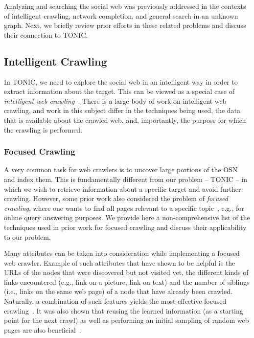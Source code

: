 \documentclass[journal]{IEEEtran}
\begin{document}


Analyzing and searching the social web was previously addressed in the contexts of intelligent crawling, network completion, and general search in an unknown graph. Next, we briefly review prior efforts in these related problems and discuss their connection to TONIC.


\subsection{Intelligent Crawling}
\label{sec:webCrawling}
In TONIC, we need to explore the social web in an intelligent way in order to extract information about the target. This can be viewed as a special case of {\em intelligent web crawling}~\cite{aggarwal2001intelligent,zareh2007fica,cai2008irobot}. %
There is a large body of work on intelligent web crawling, and work in this subject differ in the techniques being used, the data that is available about the crawled web, and, importantly, the purpose for which the crawling is performed. 


\subsubsection{Focused Crawling}
A very common task for web crawlers is to uncover large portions of the OSN and index them. This is fundamentally different from our problem -- TONIC -- in which we wish to retrieve information about a specific target and avoid further crawling. However, some prior work also considered the problem of {\em focused crawling}, where one wants to find  all pages relevant to a specific topic~\cite{diligenti2000focused,menczer2001evaluating}, e.g., for online query answering purposes. We provide here a non-comprehensive list of the techniques used in prior work for focused crawling and discuss their applicability to our problem. 



Many attributes can be taken into consideration while implementing a focused web crawler. Example of such attributes that have shown to be helpful is the URLs of the nodes that were discovered but not visited yet, the different kinds of links encountered (e.g., link on a picture, link on text) and the number of siblings (i.e., links on the same web page) of a node that have already been crawled. Naturally, a combination of such features yields the most effective focused crawling~\cite{aggarwal2001intelligent}.
It was also shown that reusing the learned information (as a starting point for the next crawl) as well as performing an initial sampling of random web pages are also beneficial~\cite{cai2008irobot}.
 
\end{document}
